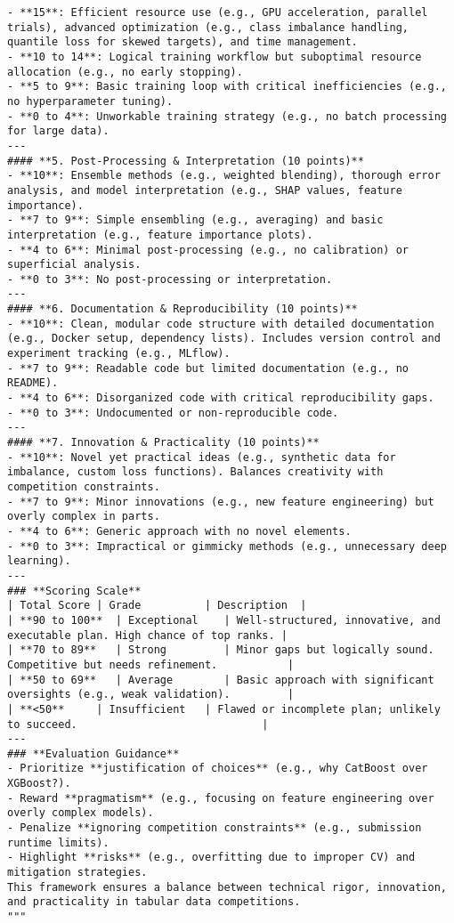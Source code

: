 \begin{lstlisting}[style=pythonstyle]
- **15**: Efficient resource use (e.g., GPU acceleration, parallel trials), advanced optimization (e.g., class imbalance handling, quantile loss for skewed targets), and time management.  
- **10 to 14**: Logical training workflow but suboptimal resource allocation (e.g., no early stopping).  
- **5 to 9**: Basic training loop with critical inefficiencies (e.g., no hyperparameter tuning).  
- **0 to 4**: Unworkable training strategy (e.g., no batch processing for large data).  
---
#### **5. Post-Processing & Interpretation (10 points)**  
- **10**: Ensemble methods (e.g., weighted blending), thorough error analysis, and model interpretation (e.g., SHAP values, feature importance).  
- **7 to 9**: Simple ensembling (e.g., averaging) and basic interpretation (e.g., feature importance plots).  
- **4 to 6**: Minimal post-processing (e.g., no calibration) or superficial analysis.  
- **0 to 3**: No post-processing or interpretation.  
---
#### **6. Documentation & Reproducibility (10 points)**  
- **10**: Clean, modular code structure with detailed documentation (e.g., Docker setup, dependency lists). Includes version control and experiment tracking (e.g., MLflow).  
- **7 to 9**: Readable code but limited documentation (e.g., no README).  
- **4 to 6**: Disorganized code with critical reproducibility gaps.  
- **0 to 3**: Undocumented or non-reproducible code.  
---
#### **7. Innovation & Practicality (10 points)**  
- **10**: Novel yet practical ideas (e.g., synthetic data for imbalance, custom loss functions). Balances creativity with competition constraints.  
- **7 to 9**: Minor innovations (e.g., new feature engineering) but overly complex in parts.  
- **4 to 6**: Generic approach with no novel elements.  
- **0 to 3**: Impractical or gimmicky methods (e.g., unnecessary deep learning).  
---
### **Scoring Scale**  
| Total Score | Grade          | Description  |  
| **90 to 100**  | Exceptional    | Well-structured, innovative, and executable plan. High chance of top ranks. |  
| **70 to 89**   | Strong         | Minor gaps but logically sound. Competitive but needs refinement.           |  
| **50 to 69**   | Average        | Basic approach with significant oversights (e.g., weak validation).         |  
| **<50**     | Insufficient   | Flawed or incomplete plan; unlikely to succeed.                             |  
---
### **Evaluation Guidance**  
- Prioritize **justification of choices** (e.g., why CatBoost over XGBoost?).  
- Reward **pragmatism** (e.g., focusing on feature engineering over overly complex models).  
- Penalize **ignoring competition constraints** (e.g., submission runtime limits).  
- Highlight **risks** (e.g., overfitting due to improper CV) and mitigation strategies.  
This framework ensures a balance between technical rigor, innovation, and practicality in tabular data competitions.
"""


\end{lstlisting}
